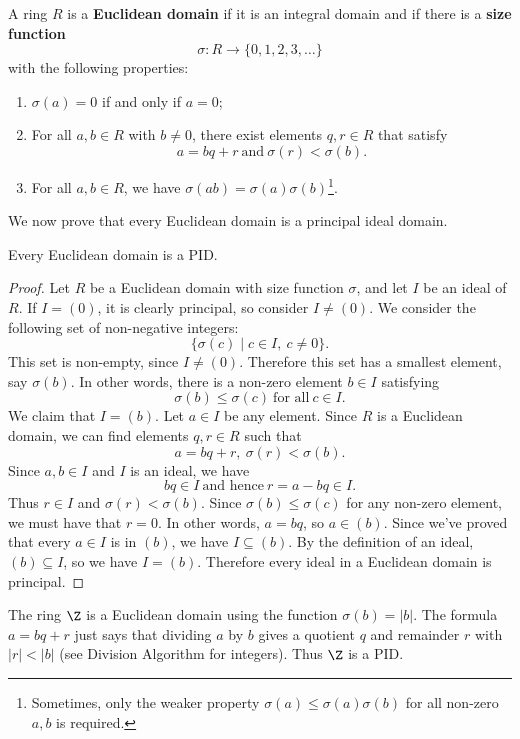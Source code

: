 \documentclass[math1530-lecture-notes]{subfiles}
\begin{document}
\begin{definition}{}
  A ring $R$ is a \textbf{Euclidean domain} if it is an integral domain and if there is a
  \textbf{size function} \[
    \sigma:R\longrightarrow \{ 0,1,2,3,\ldots \}
  \] with the following properties:
  \begin{enumerate}
    \item $\sigma(a)=0$ if and only if $a=0$;
    \item For all $a,b\in R$ with $b\neq 0$, there exist elements $q,r\in R$ that satisfy \[
          a=bq+r~\text{and}~\sigma(r)<\sigma(b)
      .\] 
    \item For all $a,b\in R$, we have $\sigma(ab)=\sigma(a)\sigma(b)$\footnote{Sometimes, only the
      weaker property $\sigma(a)\le \sigma(a)\sigma(b)$ for all non-zero $a,b$ is required.}.
  \end{enumerate}
\end{definition}
We now prove that every Euclidean domain is a principal ideal domain.
\begin{theorem}[]{}
  Every Euclidean domain is a PID.
\end{theorem}
\begin{proof}[Proof]
  Let $R$ be a Euclidean domain with size function $\sigma$, and let $I$ be an ideal of $R$. If
  $I=(0)$, it is clearly principal, so consider $I\neq (0)$. We consider the following set of
  non-negative integers: \[
    \{\sigma(c)\mid c\in I,\ c\neq 0 \} 
  .\] This set is non-empty, since $I\neq (0)$. Therefore this set has a smallest element, say
  $\sigma(b)$. In other words, there is a non-zero element $b\in I$ satisfying \[
    \sigma(b)\le \sigma(c) ~\text{for all}~c\in I
  .\] We claim that $I=(b)$. Let $a\in I$ be any element. Since $R$ is a Euclidean domain, we can
  find elements $q,r\in R$ such that \[
    a=bq+r,\ \sigma(r)<\sigma(b)
  .\] Since $a,b\in I$ and $I$ is an ideal, we have \[
    bq\in I~\text{and hence}~r=a-bq\in I
  .\] Thus $r\in I$ and $\sigma(r)<\sigma(b)$. Since $\sigma(b)\le \sigma(c)$ for any non-zero
  element, we must have that $r=0$. In other words, $a=bq$, so $a\in (b)$. Since we've proved that
  every $a\in I$ is in $(b)$, we have $I\subseteq (b)$. By the definition of an ideal, $(b)\subseteq
  I$, so we have $I=(b)$. Therefore every ideal in a Euclidean domain is principal.
\end{proof}

The ring $\Z$ is a Euclidean domain using the function $\sigma(b)=\left| b \right| $. The formula
$a=bq+r$ just says that dividing $a$ by $b$ gives a quotient $q$ and remainder $r$ with $\left| r
\right| <\left| b \right| $ (see Division Algorithm for integers). Thus $\Z$ is a PID.
\end{document}
